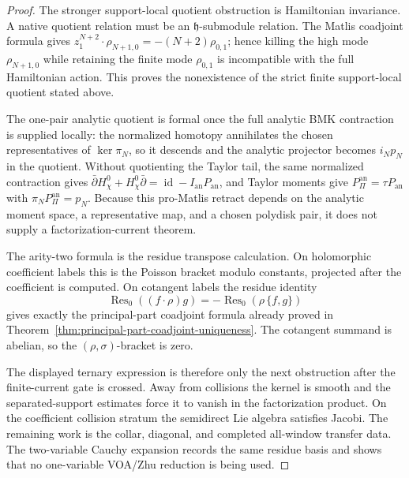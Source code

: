 \documentclass[11pt]{memoir}
\begin{document}
\begin{proof}
  The stronger support-local quotient obstruction is Hamiltonian
  invariance.  A native quotient relation must be an
  \(\mathfrak h\)-submodule relation.  The Matlis coadjoint formula gives
  \(z_1^{N+2}\cdot\rho_{N+1,0}=-(N+2)\rho_{0,1}\); hence killing the high
  mode \(\rho_{N+1,0}\) while retaining the finite mode \(\rho_{0,1}\)
  is incompatible with the full Hamiltonian action.  This proves the
  nonexistence of the strict finite support-local quotient stated above.

  The one-pair analytic quotient is formal once the full analytic BMK
  contraction is supplied locally: the normalized homotopy annihilates
  the chosen representatives of \(\ker\pi_N\), so it descends and the
  analytic projector becomes \(i_Np_N\) in the quotient.  Without
  quotienting the Taylor tail, the same normalized contraction gives
  \(\bar\partial H_\chi^0+H_\chi^0\bar\partial
  =\operatorname{id}-I_{\mathrm{an}}P_{\mathrm{an}}\), and Taylor
  moments give \(P_{\Pi}^{\mathrm{an}}=\tau P_{\mathrm{an}}\) with
  \(\pi_NP_{\Pi}^{\mathrm{an}}=p_N\).  Because this pro-Matlis retract
  depends on the analytic moment space, a representative map, and a
  chosen polydisk pair, it does not supply a factorization-current
  theorem.

  The arity-two formula is the residue transpose calculation.  On
  holomorphic coefficient labels this is the Poisson bracket modulo
  constants, projected after the coefficient is computed.  On cotangent
  labels the residue identity
  \[
    \operatorname{Res}_0((f\cdot\rho)g)
      =
      -\operatorname{Res}_0(\rho\,\{f,g\})
  \]
  gives exactly the principal-part coadjoint formula already proved in
  Theorem~\ref{thm:principal-part-coadjoint-uniqueness}.  The cotangent
  summand is abelian, so the \((\rho,\sigma)\)-bracket is zero.

  The displayed ternary expression is therefore only the next obstruction
  after the finite-current gate is crossed.  Away from collisions the
  kernel is smooth and the separated-support estimates force it to vanish
  in the factorization product.  On the coefficient collision stratum the
  semidirect Lie algebra satisfies Jacobi.  The remaining work is the
  collar, diagonal, and completed all-window transfer data.  The
  two-variable Cauchy expansion records the same residue basis and shows
  that no one-variable VOA/Zhu reduction is being used.
\end{proof}
\end{document}
